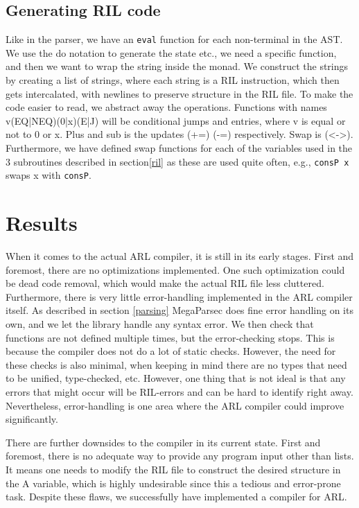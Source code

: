 \documentclass[a4paper]{article}
\begin{document}
\subsection{Generating RIL code}
\label{sec:org428beb7}
Like in the parser, we have an \texttt{eval} function for each non-terminal in the AST. We use the do notation to generate the state etc., we need a specific function, and then we want to wrap the string inside the monad. We construct the strings by creating a list of strings, where each string is a RIL instruction, which then gets intercalated, with newlines to preserve structure in the RIL file. To make the code easier to read, we abstract away the operations. Functions with names v(EQ|NEQ)(0|x)(E|J) will be conditional jumps and entries, where v is equal or not to 0 or x. Plus and sub is the updates (+=) (-=) respectively. Swap is (<->). Furthermore, we have defined swap functions for each of the variables used in the 3 subroutines described in section\ref{ril} as these are used quite often, e.g., \texttt{consP x} swaps x with \texttt{consP}.

\section{Results}
\label{sec:org79dc61e}
When it comes to the actual ARL compiler, it is still in its early stages. First and foremost, there are no optimizations implemented. One such optimization could be dead code removal, which would make the actual RIL file less cluttered. Furthermore, there is very little error-handling implemented in the ARL compiler itself. As described in section \ref{parsing} MegaParsec does fine error handling on its own, and we let the library handle any syntax error. We then check that functions are not defined multiple times, but the error-checking stops. This is because the compiler does not do a lot of static checks. However, the need for these checks is also minimal, when keeping in mind there are no types that need to be unified, type-checked, etc. However, one thing that is not ideal is that any errors that might occur will be RIL-errors and can be hard to identify right away. Nevertheless, error-handling is one area where the ARL compiler could improve significantly.

There are further downsides to the compiler in its current state. First and foremost, there is no adequate way to provide any program input other than lists. It means one needs to modify the RIL file to construct the desired structure in the A variable, which is highly undesirable since this a tedious and error-prone task. Despite these flaws, we successfully have implemented a compiler for ARL.
\end{document}
